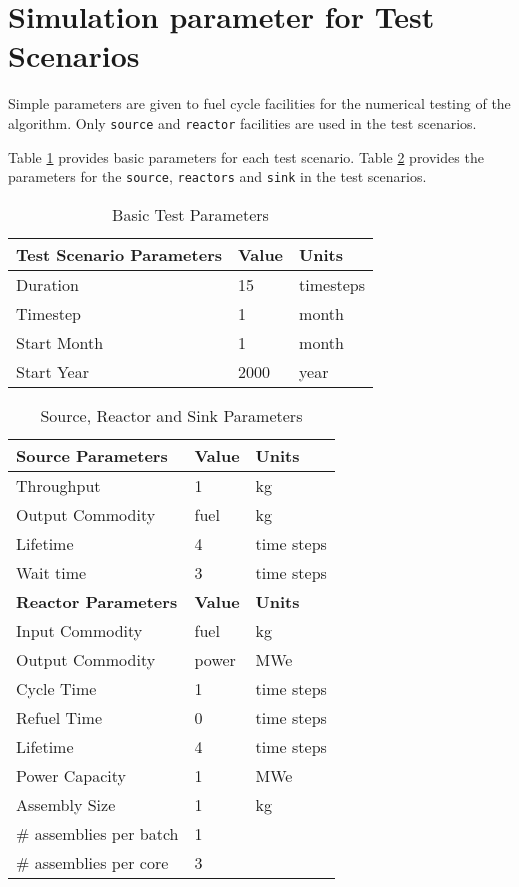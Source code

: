 \documentclass[11pt,letterpaper]{article}
\begin{document}
\section{Simulation parameter for Test Scenarios}
Simple parameters are given to fuel cycle facilities for the numerical testing of 
the algorithm.  Only \texttt{source} and \texttt{reactor} facilities are used in the test scenarios. 

Table \ref{tab:testscenario} provides basic parameters for each test scenario. Table \ref{tab:reactor} provides the parameters for the \texttt{source}, \texttt{reactors} and \texttt{sink} in the test scenarios.

\begin{table}[H]
	\centering
	\caption {Basic Test Parameters}
	\label{tab:testscenario}
	\begin{tabular}{|l|l|l|}
		\hline
		\textbf{Test Scenario Parameters} & \textbf{Value} & \textbf{Units} \\
		\hline
		Duration & 15 & timesteps \\
		Timestep & 1 & month \\
		Start Month & 1 & month \\
		Start Year & 2000 & year \\
		\hline
	\end{tabular}
\end{table}

\begin{table}[H]
	\centering
    \caption {Source, Reactor and Sink Parameters}
	\label{tab:reactor}
	\begin{tabular}{|l|l|l|}
\hline
\textbf{Source Parameters} & \textbf{Value} & \textbf{Units} \\
\hline
Throughput & 1 & kg \\
Output Commodity & fuel & kg\\
Lifetime & 4 & time steps \\
Wait time & 3 & time steps \\
\hline
\textbf{Reactor Parameters} & \textbf{Value} & \textbf{Units} \\
\hline
Input Commodity & fuel & kg\\
Output Commodity & power & MWe\\
Cycle Time & 1 & time steps \\
Refuel Time & 0 & time steps \\
Lifetime & 4 & time steps \\
Power Capacity & 1& MWe \\
Assembly Size & 1 & kg \\
\# assemblies per batch & 1 & \\
\# assemblies per core & 3 & \\
\hline
	\end{tabular}
\end{table}
\end{document}
